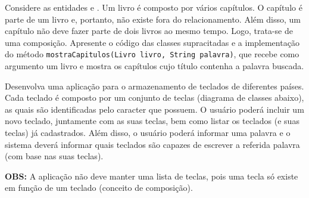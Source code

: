 \begin{exercise}[LivroCapitulos]
Considere as entidades  e . Um livro é composto por vários capítulos. O capítulo é parte de um livro e, portanto, não existe fora do relacionamento. Além disso, um capítulo não deve fazer parte de dois livros ao mesmo tempo. Logo, trata-se de uma composição. Apresente o código das classes supracitadas e a implementação do método \texttt{mostraCapitulos(Livro livro, String palavra)}, que recebe como argumento um livro e mostra os capítulos cujo título contenha a palavra buscada.

\begin{figure}[h]
	\centering
	
	\end{figure}
\end{exercise}

\begin{exercise}[TecladoTecla]
Desenvolva uma aplicação para o armazenamento de teclados de diferentes países. Cada teclado é composto por um conjunto de teclas (diagrama de classes abaixo), as quais são identificadas pelo caracter que possuem. O usuário poderá incluir um novo teclado, juntamente com as suas teclas, bem como listar os teclados (e suas teclas) já cadastrados. Além disso, o usuário poderá informar uma palavra e o sistema deverá informar quais teclados são capazes de escrever a referida palavra (com base nas suas teclas).

\textbf{OBS:} A aplicação não deve manter uma lista de teclas, pois uma tecla só existe em função de um teclado (conceito de composição).

\begin{figure}[h]
	\centering
\end{figure}
\end{exercise}

